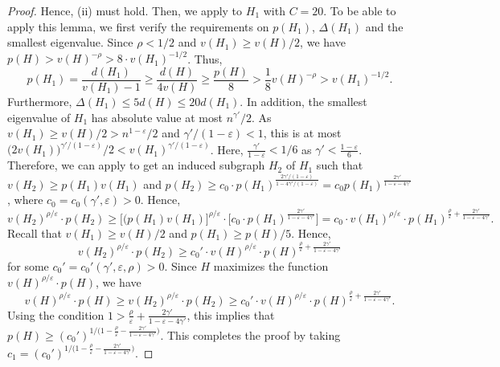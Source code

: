 \documentclass[11pt]{article}
\theoremstyle{plain}
\theoremstyle{definition}
\newcommand{\eps}{\varepsilon}
\begin{document}
\begin{proof}
    Hence, (ii) must hold. 
    Then, we apply  to $H_1$ with $C=20$.
    To be able to apply this lemma, we first verify the requirements on $p(H_1)$, $\Delta(H_1)$ and the smallest eigenvalue. Since $\rho< 1/2$ and $v(H_1) \ge v(H) / 2$, we have $p(H) > v(H)^{-\rho} > 8\cdot v(H_1)^{-1/2}$. 
    Thus, $$p(H_1) = \frac{d(H_1)}{v(H_1)-1} \ge \frac{d(H)}{4v(H)}\ge \frac{p(H)}{8}>\frac{1}{8}v(H)^{-\rho}>v(H_1)^{-1/2}.$$
    Furthermore, $\Delta(H_1) \le 5d(H) \le 20d(H_1)$.
    In addition, the smallest eigenvalue of $H_1$ has absolute value at most $n^{\gamma'}/2$. 
    As $v(H_1) \ge v(H)/2 > n^{1-\eps}/2$ and $\gamma'/(1-\eps) < 1$, this is at most $\big(2v(H_1)\big)^{\gamma'/(1-\eps)}/2 < v(H_1)^{\gamma'/(1-\eps)}$.
    Here, $\frac{\gamma'}{1-\eps} <1/6$ as $\gamma' < \frac{1-\eps}{6}$.   
    Therefore, we can apply  to get an induced subgraph $H_2$ of $H_1$ such that $v(H_2) \ge p(H_1)v(H_1)$ and $p(H_2) \ge c_0 \cdot p(H_1)^{\frac{2\gamma'/(1-\eps)}{1-4\gamma'/(1-\eps)}}=c_0p(H_1)^{\frac{2\gamma'}{1-\eps-4\gamma'}}$, where $c_0=c_0(\gamma',\eps) > 0$.
    Hence, $$
        v(H_2)^{\rho/\eps}\cdot p(H_2)
        \ge \big[(p(H_1)v(H_1) \big]^{\rho/\eps}\cdot \Big[c_0 \cdot p(H_1)^{\frac{2\gamma'}{1-\eps-4\gamma'}}\Big]
        = c_0\cdot v(H_1)^{\rho/\eps}\cdot p(H_1)^{\frac{\rho}{\eps}+\frac{2\gamma'}{1-\eps-4\gamma'}}.
    $$
    Recall that $v(H_1) \ge v(H)/2$ and $p(H_1) \ge p(H)/5$. Hence,
   $$
        v(H_2)^{\rho/\eps}\cdot p(H_2)
        \ge c_0'\cdot v(H)^{\rho/\eps}\cdot p(H)^{\frac{\rho}{\eps}+\frac{2\gamma'}{1-\eps-4\gamma'}}    
    $$
    for some  $c_0'=c_0'(\gamma',\eps,\rho)>0$.  Since $H$ maximizes the function $v(H)^{\rho/\eps}\cdot p(H)$, we have 
    $$        v(H)^{\rho/\eps}\cdot p(H)
        \ge v(H_2)^{\rho/\eps}\cdot p(H_2)
        \ge c_0'\cdot v(H)^{\rho/\eps}\cdot p(H)^{\frac{\rho}{\eps}+\frac{2\gamma'}{1-\eps-4\gamma'}}.$$
    Using the condition $1>\frac{\rho}{\eps}+\frac{2\gamma'}{1-\eps-4\gamma'}$, this implies that $p(H) \ge (c_0')^{1/\big(1-\frac{\rho}{\eps}-\frac{2\gamma'}{1-\eps-4\gamma'}\big)}$.
    This completes the proof by taking $c_1=(c_0')^{1/\big(1-\frac{\rho}{\eps}-\frac{2\gamma'}{1-\eps-4\gamma'}\big)}$.
\end{proof}
\end{document}
